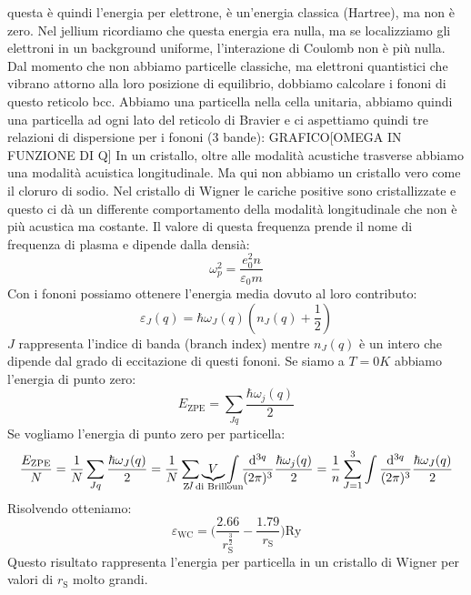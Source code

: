 questa è quindi l'energia per elettrone, è un'energia classica (Hartree), ma non è zero. Nel jellium ricordiamo che questa energia era nulla, ma se localizziamo gli elettroni in un background uniforme, l'interazione di Coulomb non è più nulla.\\
Dal momento che non abbiamo particelle classiche, ma elettroni quantistici che vibrano attorno alla loro posizione di equilibrio, dobbiamo calcolare i fononi di questo reticolo bcc. Abbiamo una particella nella cella unitaria, abbiamo quindi una particella ad ogni lato del reticolo di Bravier e ci aspettiamo quindi tre relazioni di dispersione per i fononi (3 bande):
GRAFICO[OMEGA IN FUNZIONE DI Q]
In un cristallo, oltre alle modalità acustiche trasverse abbiamo una modalità acuistica longitudinale. Ma qui non abbiamo un cristallo vero come il cloruro di sodio. Nel cristallo di Wigner le cariche positive sono cristallizzate e questo ci dà un differente comportamento della modalità longitudinale che non è più acustica ma costante. Il valore di questa frequenza prende il nome di frequenza di plasma e dipende dalla densià:
\begin{equation*}
    \omega_p^2=\frac{e_0^2n}{\varepsilon_0m}
\end{equation*}
Con i fononi possiamo ottenere l'energia media dovuto al loro contributo:
\begin{equation*}
    \varepsilon_J(q)=\hbar\omega_J(q)(n_J(q)+\frac 12)
\end{equation*}
$J$ rappresenta l'indice di banda (branch index) mentre $n_J(q)$ è un intero che dipende dal grado di eccitazione di questi fononi. Se siamo a $T=0K$ abbiamo l'energia di punto zero:
\begin{equation*}
    E_{\text{ZPE}}=\sum_{Jq}\frac{\hbar\omega_j(q)}{2}
\end{equation*}
Se vogliamo l'energia di punto zero per particella:
\begin{equation*}
    \frac{E_{\text{ZPE}}}{N}=\frac 1N\sum_{Jq}\frac{\hbar\omega_J(q)}{2}=\frac 1N\sum_J\underbrace{V}_{\mathclap{\text{Z. di Brilloun}}}\int \frac{\dd[3{q}]}{(2\pi)^3}\frac{\hbar\omega_j(q)}{2}=\frac{1}{n}\sum_{J=1}^3\int \frac{\dd[3{q}]}{(2\pi)^3}\frac{\hbar\omega_J(q)}{2}
\end{equation*}
Risolvendo otteniamo:
\begin{equation*}
    \varepsilon_{\text {WC}}=\bigg(\frac{2.66}{r_\text{S}^{\frac 32}}-\frac{1.79}{r_\text{S}}\bigg)\text{Ry}
\end{equation*}
Questo risultato rappresenta l'energia per particella in un cristallo di Wigner per valori di $r_\text{S}$ molto grandi.\\
